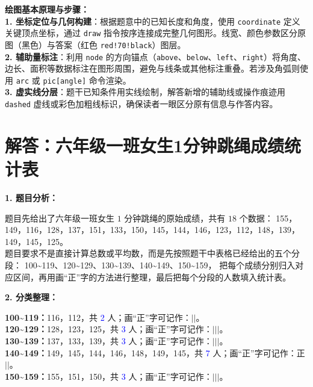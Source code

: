 \documentclass[12pt, a4paper]{ctexrep}
\begin{document}
\vspace{0.8cm}


\vspace{0.6cm}

{\small\color{blue!70!black}
\textbf{绘图基本原理与步骤：}\\
\textbf{1. 坐标定位与几何构建}：根据题意中的已知长度和角度，使用 \texttt{coordinate} 定义关键顶点坐标，通过 \texttt{draw} 指令按序连接成完整几何图形。线宽、颜色参数区分原图（黑色）与答案（红色 \texttt{red!70!black}）图层。\\
\textbf{2. 辅助量标注}：利用 \texttt{node} 的方向锚点（\texttt{above}、\texttt{below}、\texttt{left}、\texttt{right}）将角度、边长、面积等数据标注在图形周围，避免与线条或其他标注重叠。若涉及角弧则使用 \texttt{arc} 或 \texttt{pic[angle]} 命令渲染。\\
\textbf{3. 虚实线分层}：题干已知条件用实线绘制，解答新增的辅助线或操作痕迹用 \texttt{dashed} 虚线或彩色加粗线标识，确保读者一眼区分原有信息与作答内容。
}

\newpage

\section{解答：六年级一班女生1分钟跳绳成绩统计表}

\vspace{0.4cm}

\noindent\textbf{1. 题目分析：}

\vspace{0.2cm}

\noindent
题目先给出了六年级一班女生 $1$ 分钟跳绳的原始成绩，共有 $18$ 个数据：
155，149，116，128，137，151，133，150，145，144，146，123，112，148，139，149，145，125。\\[4pt]
题目要求不是直接计算总数或平均数，而是先按照题干中表格已经给出的五个分段：
100\textasciitilde119、120\textasciitilde129、130\textasciitilde139、140\textasciitilde149、150\textasciitilde159，
把每个成绩分别归入对应区间，再用画“正”字的方法进行整理，最后把每个分段的人数填入统计表。

\vspace{0.4cm}

\noindent\textbf{2. 分类整理：}

\vspace{0.2cm}

\noindent
\textbf{100\textasciitilde119：}116，112，共 \textcolor{blue}{2} 人；\quad 画“正”字可记作：$\vert\vert$。\\
\textbf{120\textasciitilde129：}128，123，125，共 \textcolor{blue}{3} 人；\quad 画“正”字可记作：$\vert\vert\vert$。\\
\textbf{130\textasciitilde139：}137，133，139，共 \textcolor{blue}{3} 人；\quad 画“正”字可记作：$\vert\vert\vert$。\\
\textbf{140\textasciitilde149：}149，145，144，146，148，149，145，共 \textcolor{blue}{7} 人；\quad 画“正”字可记作：正$\vert\vert$。\\
\textbf{150\textasciitilde159：}155，151，150，共 \textcolor{blue}{3} 人；\quad 画“正”字可记作：$\vert\vert\vert$。
\end{document}
